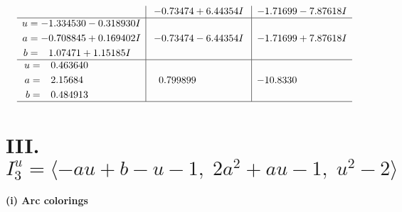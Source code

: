 \documentclass[1p]{elsarticle_modified}
\theoremstyle{definition}
\begin{document}
$$\begin{array}{c|c|c}
 & -0.73474 + 6.44354 I & -1.71699 - 7.87618 I \\ \hline\begin{aligned}
u &= -1.334530 - 0.318930 I \\
a &= -0.708845 + 0.169402 I \\
b &= \phantom{-}1.07471 + 1.15185 I\end{aligned}
 & -0.73474 - 6.44354 I & -1.71699 + 7.87618 I \\ \hline\begin{aligned}
u &= \phantom{-}0.463640\phantom{ +0.000000I} \\
a &= \phantom{-}2.15684\phantom{ +0.000000I} \\
b &= \phantom{-}0.484913\phantom{ +0.000000I}\end{aligned}
 & \phantom{-}0.799899\phantom{ +0.000000I} & -10.8330\phantom{ +0.000000I}\\
 \hline 
 \end{array}$$\newpage\newpage\renewcommand{\arraystretch}{1}
\centering \section*{III. $I^u_{3}= \langle - a u+b- u-1,\;2 a^2+a u-1,\;u^2-2 \rangle$}
\flushleft \textbf{(i) Arc colorings}\\
\end{document}
